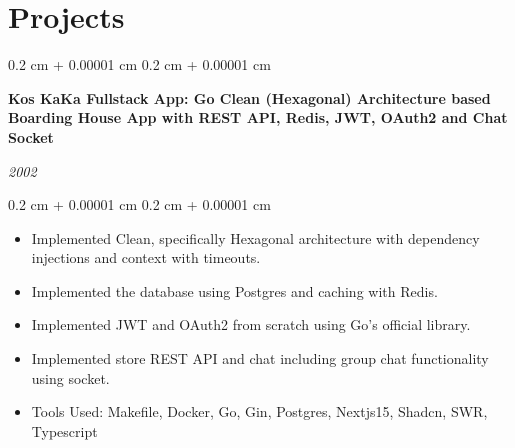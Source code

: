 \documentclass[10pt, letterpaper]{article}
\newenvironment{highlights}{
    \begin{itemize}[
        topsep=0.10 cm,
        parsep=0.10 cm,
        partopsep=0pt,
        itemsep=0pt,
        leftmargin=0.4 cm + 10pt
    ]
}{
    \end{itemize}
} %
\newenvironment{onecolentry}{
    \begin{adjustwidth}{
        0.2 cm + 0.00001 cm
    }{
        0.2 cm + 0.00001 cm
    }
}{
    \end{adjustwidth}
} %
\newenvironment{twocolentry}[2][]{
    \onecolentry
    \def\secondColumn{#2}
    \setcolumnwidth{\fill, 4.5 cm}
    \begin{paracol}{2}
}{
    \switchcolumn \raggedleft \secondColumn
    \end{paracol}
    \endonecolentry
} %
\let\hrefWithoutArrow\href
\renewcommand{\href}[2]{\hrefWithoutArrow{#1}{\ifthenelse{\equal{#2}{}}{ }{#2 }\raisebox{.15ex}{\footnotesize \faExternalLink*}}}
\begin{document}







    \section{Projects}

        \begin{twocolentry}{

        \textit{2002}}
            \textbf{Kos KaKa Fullstack App: Go Clean (Hexagonal) Architecture based Boarding House App with REST API, Redis, JWT, OAuth2 and Chat Socket}
        \end{twocolentry}

        \vspace{0.10 cm}
        \begin{onecolentry}
            \begin{highlights}
                \item Implemented Clean, specifically Hexagonal architecture with dependency injections and context with timeouts.
                \item Implemented the database using Postgres and caching with Redis.
                \item Implemented JWT and OAuth2 from scratch using Go's official library.
                \item Implemented store REST API and chat including group chat functionality using socket.
                \item Tools Used: Makefile, Docker, Go, Gin, Postgres, Nextjs15, Shadcn, SWR, Typescript
            \end{highlights}
        \end{onecolentry}
\end{document}
